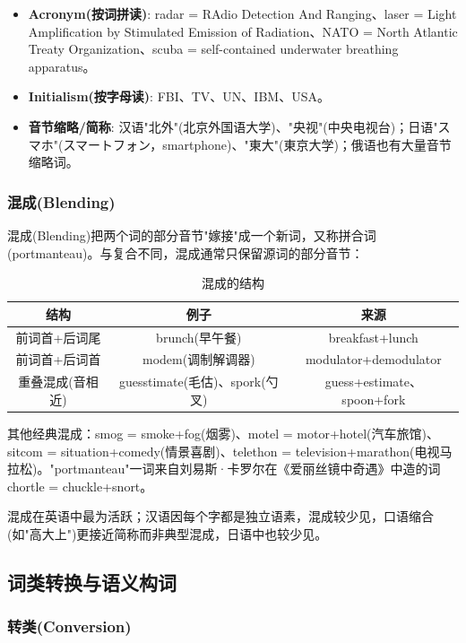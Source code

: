 \begin{itemize}
    \item \textbf{Acronym(按词拼读)}: radar = RAdio Detection And Ranging、laser = Light Amplification by Stimulated Emission of Radiation、NATO = North Atlantic Treaty Organization、scuba = self-contained underwater breathing apparatus。
    \item \textbf{Initialism(按字母读)}: FBI、TV、UN、IBM、USA。
    \item \textbf{音节缩略/简称}: 汉语"北外"(北京外国语大学)、"央视"(中央电视台)；日语"スマホ"(スマートフォン，smartphone)、"東大"(東京大学)；俄语也有大量音节缩略词。
\end{itemize}

\subsubsection{混成(Blending)}

混成(Blending)把两个词的部分音节"嫁接"成一个新词，又称拼合词(portmanteau)。与复合不同，混成通常只保留源词的部分音节：

\begin{table}[H]
\centering
\caption{混成的结构}
\begin{tabulary}{\textwidth}{@{}CCC@{}}
\toprule
\textbf{结构} & \textbf{例子} & \textbf{来源} \\
\midrule
前词首+后词尾 & brunch(早午餐) & breakfast+lunch \\
前词首+后词首 & modem(调制解调器) & modulator+demodulator \\
重叠混成(音相近) & guesstimate(毛估)、spork(勺叉) & guess+estimate、spoon+fork \\
\bottomrule
\end{tabulary}
\end{table}

其他经典混成：smog = smoke+fog(烟雾)、motel = motor+hotel(汽车旅馆)、sitcom = situation+comedy(情景喜剧)、telethon = television+marathon(电视马拉松)。"portmanteau"一词来自刘易斯·卡罗尔在《爱丽丝镜中奇遇》中造的词 chortle = chuckle+snort。

混成在英语中最为活跃；汉语因每个字都是独立语素，混成较少见，口语缩合(如"高大上")更接近简称而非典型混成，日语中也较少见。

\subsection{词类转换与语义构词}

\subsubsection{转类(Conversion)}

